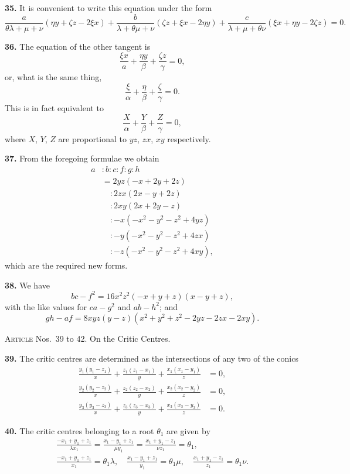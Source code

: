 \documentclass[11pt,a4paper]{article}
\theoremstyle{plain}
\theoremstyle{definition}
\begin{document}
\textbf{35.} It is convenient to write this equation under the form
\[
\frac{a}{\theta\lambda + \mu + \nu}(\eta y + \zeta z - 2\xi x)
+ \frac{b}{\lambda + \theta\mu + \nu}(\zeta z + \xi x - 2\eta y)
+ \frac{c}{\lambda + \mu + \theta\nu}(\xi x + \eta y - 2\zeta z) = 0.
\]

\textbf{36.} The equation of the other tangent is
\[
\frac{\xi x}{a} + \frac{\eta y}{\beta} + \frac{\zeta z}{\gamma} = 0,
\]
or, what is the same thing,
\[
\frac{\xi}{\alpha} + \frac{\eta}{\beta} + \frac{\zeta}{\gamma} = 0.
\]
This is in fact equivalent to
\[
\frac{X}{\alpha} + \frac{Y}{\beta} + \frac{Z}{\gamma} = 0,
\]
where $X$, $Y$, $Z$ are proportional to $yz$, $zx$, $xy$ respectively.

\textbf{37.} From the foregoing formulae we obtain
\begin{align*}
a &: b : c : f : g : h \\
&= 2yz(-x + 2y + 2z) \\
&\quad : 2zx(2x - y + 2z) \\
&\quad : 2xy(2x + 2y - z) \\
&\quad : -x(-x^2 - y^2 - z^2 + 4yz) \\
&\quad : -y(-x^2 - y^2 - z^2 + 4zx) \\
&\quad : -z(-x^2 - y^2 - z^2 + 4xy),
\end{align*}
which are the required new forms.

\textbf{38.} We have
\[
bc - f^2 = 16x^2z^2(-x + y + z)(x - y + z),
\]
with the like values for $ca - g^2$ and $ab - h^2$; and
\[
gh - af = 8xyz(y - z)(x^2 + y^2 + z^2 - 2yz - 2zx - 2xy).
\]

\bigskip

\noindent\textsc{Article} Nos.~39 to 42.  On the Critic Centres.

\medskip

\textbf{39.} The critic centres are determined as the intersections of any two of the conics
\begin{align*}
\frac{y_1(y_1 - z_1)}{x} + \frac{z_1(z_1 - x_1)}{y} + \frac{x_1(x_1 - y_1)}{z} &= 0, \\
\frac{y_2(y_2 - z_2)}{x} + \frac{z_2(z_2 - x_2)}{y} + \frac{x_2(x_2 - y_2)}{z} &= 0, \\
\frac{y_3(y_3 - z_3)}{x} + \frac{z_3(z_3 - x_3)}{y} + \frac{x_3(x_3 - y_3)}{z} &= 0.
\end{align*}

\textbf{40.} The critic centres belonging to a root $\theta_1$ are given by
\begin{gather*}
\frac{-x_1 + y_1 + z_1}{\lambda x_1} = \frac{x_1 - y_1 + z_1}{\mu y_1} = \frac{x_1 + y_1 - z_1}{\nu z_1} = \theta_1, \\
\frac{-x_1 + y_1 + z_1}{x_1} = \theta_1\lambda,\quad
\frac{x_1 - y_1 + z_1}{y_1} = \theta_1\mu,\quad
\frac{x_1 + y_1 - z_1}{z_1} = \theta_1\nu.
\end{gather*}
\end{document}
